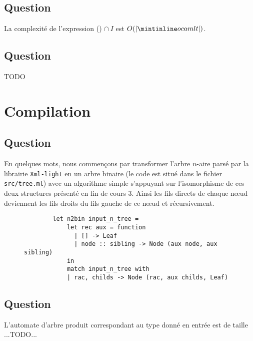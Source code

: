 \documentclass[twoside,11pt]{article}
\begin{document}
\subsection{Question}

La complexité de l'expression () $\cap\ I$ est $O(|\ocaml{t}|)$.


\subsection{Question} TODO


\section{Compilation}
\subsection{Question}
En quelques mots, nous commençons par transformer l'arbre $n$-aire parsé
par la librairie \texttt{Xml-light} en un arbre binaire (le code est situé
dans le fichier \texttt{src/tree.ml}) avec un algorithme simple s'appuyant
sur l'isomorphisme de ces deux structures présenté en fin de cours 3. Ainsi
les fils directs de chaque n\oe{}ud deviennent les fils droits du fils gauche
de ce n\oe{}ud et récursivement.

\begin{figure}[H]
\begin{verbatim}
        let n2bin input_n_tree =
            let rec aux = function
              | [] -> Leaf
              | node :: sibling -> Node (aux node, aux sibling)
            in
            match input_n_tree with
            | rac, childs -> Node (rac, aux childs, Leaf)
\end{verbatim}
\end{figure}


\subsection{Question}
L'automate d'arbre produit correspondant au type donné en entrée est de taille ...TODO...
\end{document}
